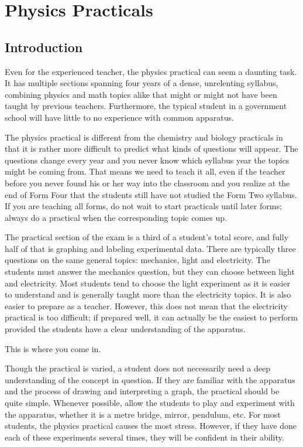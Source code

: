 \chapter{Physics Practicals}

\section{Introduction}

Even for the experienced teacher, the physics practical can seem a daunting task.
It has multiple sections spanning four years of a dense, unrelenting syllabus, combining
physics and math topics alike that might or might not have been taught by previous
teachers. Furthermore, the typical student in a government school will have little to no
experience with common apparatus.

The physics practical is different from the chemistry and biology practicals in that
it is rather more difficult to predict what kinds of questions will appear. The questions
change every year and you never know which syllabus year the topics might be coming
from. That means we need to teach it all, even if the teacher before you never found his
or her way into the classroom and you realize at the end of Form Four that the students
still have not studied the Form Two syllabus. If you are teaching all forms, do not wait to
start practicals until later forms; always do a practical when the corresponding topic
comes up.

The practical section of the exam is a third of a student’s total score, and fully half
of that is graphing and labeling experimental data. There are typically three questions on
the same general topics: mechanics, light and electricity. The students must answer the
mechanics question, but they can choose between light and electricity. Most students tend
to choose the light experiment as it is easier to understand and is generally taught more
than the electricity topics. It is also easier to prepare as a teacher. However, this does not
mean that the electricity practical is too difficult; if prepared well, it can actually be the
easiest to perform provided the students have a clear understanding of the apparatus.

This is where you come in.

Though the practical is varied, a student does not necessarily need a deep
understanding of the concept in question. If they are familiar with the apparatus and the
process of drawing and interpreting a graph, the practical should be quite simple.
Whenever possible, allow the students to play and experiment with the apparatus,
whether it is a metre bridge, mirror, pendulum, etc. For most students, the physics
practical causes the most stress. However, if they have done each of these experiments
several times, they will be confident in their ability.

